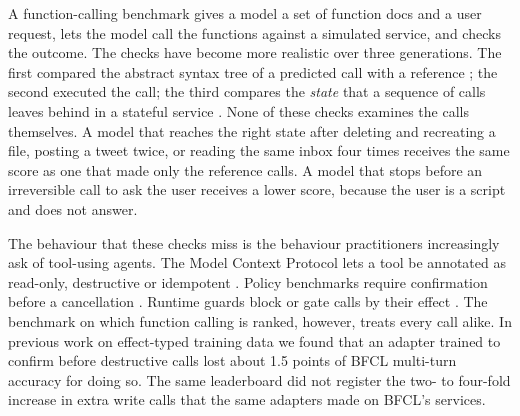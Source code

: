 \documentclass{article}
\begin{document}
A function-calling benchmark gives a model a set of function docs and a user request, lets the model call the functions
against a simulated service, and checks the outcome. The checks have become more realistic over three generations. The
first compared the abstract syntax tree of a predicted call with a reference \citep{patil2024gorilla}; the second
executed the call; the third compares the \emph{state} that a sequence of calls leaves behind in a stateful service
\citep{patil2025bfcl}. None of these checks examines the calls themselves. A model that reaches the right state after
deleting and recreating a file, posting a tweet twice, or reading the same inbox four times receives the same score as
one that made only the reference calls. A model that stops before an irreversible call to ask the user receives a
lower score, because the user is a script and does not answer.

The behaviour that these checks miss is the behaviour practitioners increasingly ask of tool-using agents. The Model
Context Protocol lets a tool be annotated as read-only, destructive or idempotent \citep{mcp2025annotations}. Policy
benchmarks require confirmation before a cancellation \citep{yao2024taubench,barres2025tau2}. Runtime guards block or
gate calls by their effect \citep{kang2026polar,nexus2026}. The benchmark on which function calling is ranked, however,
treats every call alike. In previous work on effect-typed training data \citep{kovalenko2026effectworld} we found that
an adapter trained to confirm before destructive calls lost about 1.5 points of BFCL multi-turn accuracy for doing so.
The same leaderboard did not register the two- to four-fold increase in extra write calls that the same adapters made on
BFCL's services.
\end{document}
